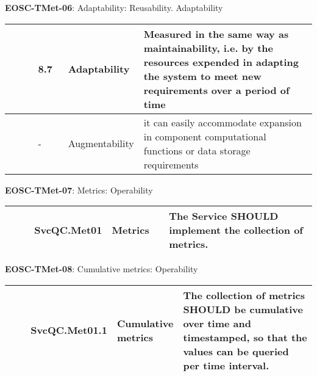 \textbf{EOSC-TMet-06}: Adaptability: Reusability. Adaptability
\nopagebreak[4]
\begin{center}
    \tabletail{\hline}
    \tiny
    \begin{supertabular}{|p{0.10\linewidth}|p{0.10\linewidth}|p{0.20\linewidth}|p{0.60\linewidth}|} \hline
        \cite{gillies_modelling_1992} & 8.7 & Adaptability & Measured in the same way as maintainability, i.e. by the resources expended in adapting the system to meet new requirements over a period of time\\ \hline
        \cite{boehm_quantitative_1976} & - & Augmentability & it can easily accommodate expansion in component computational functions or data storage requirements\\ \hline
    \end{supertabular}
\end{center}

\textbf{EOSC-TMet-07}: Metrics: Operability
\nopagebreak[4]
\begin{center}
    \tabletail{\hline}
    \tiny
    \begin{supertabular}{|p{0.10\linewidth}|p{0.10\linewidth}|p{0.20\linewidth}|p{0.60\linewidth}|} \hline
        \cite{orviz_fernandez_eosc-synergy_2020} & SvcQC.Met01 & Metrics & The Service SHOULD implement the collection of metrics.\\ \hline
    \end{supertabular}
\end{center}

\textbf{EOSC-TMet-08}: Cumulative metrics: Operability
\nopagebreak[4]
\begin{center}
    \tabletail{\hline}
    \tiny
    \begin{supertabular}{|p{0.10\linewidth}|p{0.10\linewidth}|p{0.20\linewidth}|p{0.60\linewidth}|} \hline
        \cite{orviz_fernandez_eosc-synergy_2020} & SvcQC.Met01.1 & Cumulative metrics & The collection of metrics SHOULD be cumulative over time and timestamped, so that the values can be queried per time interval.\\ \hline
    \end{supertabular}
\end{center}

